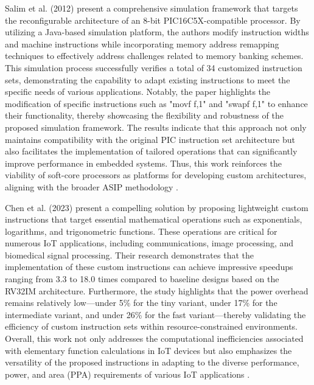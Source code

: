 Salim et al. (2012) present a comprehensive simulation framework that targets the reconfigurable architecture of an 8-bit PIC16C5X-compatible processor. By utilizing a Java-based simulation platform, the authors modify instruction widths and machine instructions while incorporating memory address remapping techniques to effectively address challenges related to memory banking schemes. This simulation process successfully verifies a total of 34 customized instruction sets, demonstrating the capability to adapt existing instructions to meet the specific needs of various applications. Notably, the paper highlights the modification of specific instructions such as "movf f,1" and "swapf f,1" to enhance their functionality, thereby showcasing the flexibility and robustness of the proposed simulation framework. The results indicate that this approach not only maintains compatibility with the original PIC instruction set architecture but also facilitates the implementation of tailored operations that can significantly improve performance in embedded systems. Thus, this work reinforces the viability of soft-core processors as platforms for developing custom architectures, aligning with the broader ASIP methodology \cite{salim2012customized}.

Chen et al. (2023) present a compelling solution by proposing lightweight custom instructions that target essential mathematical operations such as exponentials, logarithms, and trigonometric functions. These operations are critical for numerous IoT applications, including communications, image processing, and biomedical signal processing. Their research demonstrates that the implementation of these custom instructions can achieve impressive speedups ranging from 3.3 to 18.0 times compared to baseline designs based on the RV32IM architecture. Furthermore, the study highlights that the power overhead remains relatively low—under 5\% for the tiny variant, under 17\% for the intermediate variant, and under 26\% for the fast variant—thereby validating the efficiency of custom instruction sets within resource-constrained environments. Overall, this work not only addresses the computational inefficiencies associated with elementary function calculations in IoT devices but also emphasizes the versatility of the proposed instructions in adapting to the diverse performance, power, and area (PPA) requirements of various IoT applications \cite{chen2023risc}.

